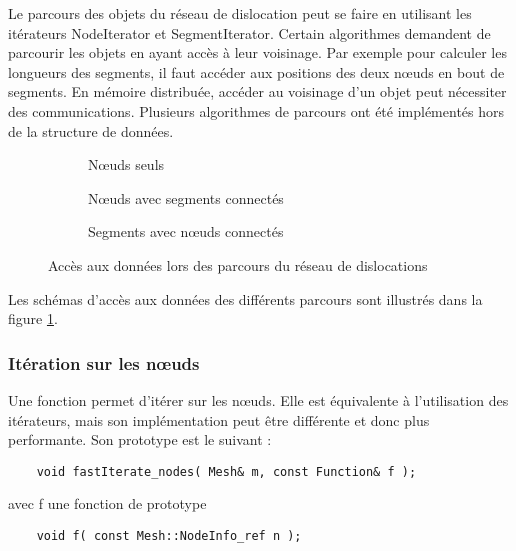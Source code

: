 Le parcours des objets du réseau de dislocation peut se faire en utilisant les itérateurs NodeIterator et SegmentIterator. Certain algorithmes demandent de parcourir les objets en ayant accès à leur voisinage. Par exemple pour calculer les longueurs des segments, il faut accéder aux positions des deux nœuds en bout de segments. En mémoire distribuée, accéder au voisinage d'un objet peut nécessiter des communications. Plusieurs algorithmes de parcours ont été implémentés hors de la structure de données.

\begin{figure}[H]
	\centering
	\begin{subfigure}[c]{0.3\textwidth}
		\centering
		\caption{Nœuds seuls}
	\end{subfigure}
	\begin{subfigure}[c]{0.3\textwidth}
		\centering
		\caption{\centering Nœuds avec segments connectés}
	\end{subfigure}
	\begin{subfigure}[c]{0.3\textwidth}
		\centering
		\caption{\centering Segments avec nœuds connectés}
	\end{subfigure}
	\caption{Accès aux données lors des parcours du réseau de dislocations}
	\label{fig:parcours_mesh}
\end{figure}

Les schémas d'accès aux données des différents parcours sont illustrés dans la figure \ref{fig:parcours_mesh}.


\subsubsection{Itération sur les nœuds}

Une fonction permet d'itérer sur les nœuds. Elle est équivalente à l'utilisation des itérateurs, mais son implémentation peut être différente et donc plus performante. Son prototype est le suivant : 

\begin{verbatim}
	void fastIterate_nodes( Mesh& m, const Function& f );
\end{verbatim}

avec f une fonction de prototype

\begin{verbatim}
	void f( const Mesh::NodeInfo_ref n );
\end{verbatim}

